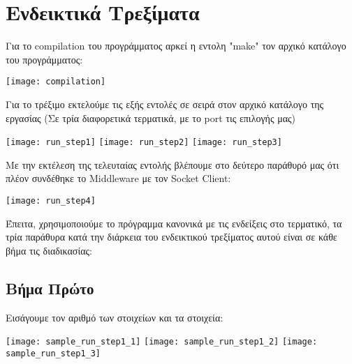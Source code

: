 \section{Ενδεικτικά Τρεξίματα}
Για το compilation του προγράμματος αρκεί η εντολη "make" τον αρχικό κατάλογο του
προγράμματος:
\\
\begin{center}
\texttt{[image: compilation]}
\end{center}
Για το τρέξιμο εκτελούμε τις εξής εντολές σε σειρά στον αρχικό κατάλογο της
εργασίας (Σε τρία διαφορετικά τερματικά, με το port τις επιλογής μας)
\begin{center}
\texttt{[image: run\_step1]}
\texttt{[image: run\_step2]}
\texttt{[image: run\_step3]}
\end{center}
Με την εκτέλεση της τελευταίας εντολής βλέπουμε στο δεύτερο παράθυρό μας ότι
πλέον συνδέθηκε το Middleware με τον Socket Client:
\begin{center}
\texttt{[image: run\_step4]}
\end{center}
Έπειτα, χρησιμοποιούμε το πρόγραμμα κανονικά με τις ενδείξεις στο τερματικό,
τα τρία παράθυρα κατά την διάρκεια του ενδεικτικού τρεξίματος αυτού είναι σε
κάθε βήμα τις διαδικασίας:
\subsection{Βήμα Πρώτο}
Εισάγουμε τον αριθμό των στοιχείων και τα στοιχεία:
\begin{center}
\texttt{[image: sample\_run\_step1\_1]}
\texttt{[image: sample\_run\_step1\_2]}
\texttt{[image: sample\_run\_step1\_3]}
\end{center}
